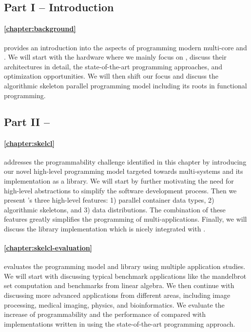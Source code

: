\subsection*{Part I -- Introduction}

\paragraph{\autoref{chapter:background}} provides an introduction into the aspects of programming modern multi-core \CPUs and \GPUs.
We will start with the hardware where we mainly focus on \GPUs, discuss their architectures in detail, the state-of-the-art programming approaches, and optimization opportunities.
We will then shift our focus and discuss the algorithmic skeleton parallel programming model including its roots in functional programming.


\subsection*{Part II -- \SkelCL}

\paragraph{\autoref{chapter:skelcl}} addresses the programmability challenge identified in this chapter by introducing our novel \SkelCL high-level programming model targeted towards multi-\GPU systems and its implementation as a \Cpp library.
We will start by further motivating the need for high-level abstractions to simplify the software development process.
Then we present \SkelCL's three high-level features:
1) parallel container data types, 2) algorithmic skeletons, and 3) data distributions.
The combination of these features greatly simplifies the programming of multi-\GPU applications.
Finally, we will discuss the \SkelCL library implementation which is nicely integrated with \Cpp.

\paragraph{\autoref{chapter:skelcl-evaluation}} evaluates the \SkelCL programming model and library using multiple application studies.
We will start with discussing typical benchmark applications like the mandelbrot set computation and benchmarks from linear algebra.
We then continue with discussing more advanced applications from different areas, including image processing, medical imaging, physics, and bioinformatics.
We evaluate the increase of programmability and the performance of \SkelCL compared with implementations written in using the state-of-the-art \OpenCL programming approach.



